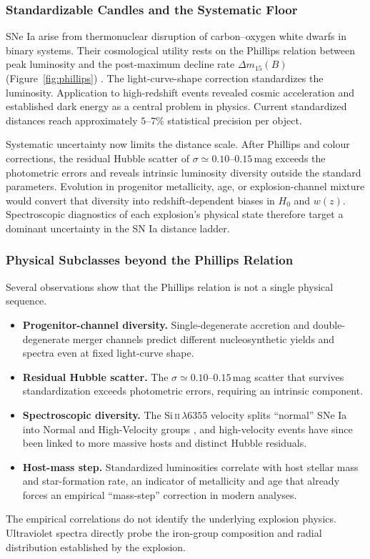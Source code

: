\subsubsection{Standardizable Candles and the Systematic Floor}

SNe Ia arise from thermonuclear disruption of carbon--oxygen white dwarfs in binary systems. Their cosmological utility rests on the Phillips relation between peak luminosity and the post-maximum decline rate $\Delta m_{15}(B)$ (Figure~\ref{fig:phillips}) \cite{phillips1993}. The light-curve-shape correction standardizes the luminosity. Application to high-redshift events revealed cosmic acceleration \cite{riess1998,perlmutter1999} and established dark energy as a central problem in physics. Current standardized distances reach approximately $5$--$7\%$ statistical precision per object.

Systematic uncertainty now limits the distance scale. After Phillips and colour corrections, the residual Hubble scatter of $\sigma\simeq0.10$--$0.15$\,mag exceeds the photometric errors and reveals intrinsic luminosity diversity outside the standard parameters. Evolution in progenitor metallicity, age, or explosion-channel mixture would convert that diversity into redshift-dependent biases in $H_0$ and $w(z)$. Spectroscopic diagnostics of each explosion's physical state therefore target a dominant uncertainty in the SN Ia distance ladder.

\subsubsection{Physical Subclasses beyond the Phillips Relation}

Several observations show that the Phillips relation is not a single physical sequence.
\begin{itemize}
\item \textbf{Progenitor-channel diversity.} Single-degenerate accretion and double-degenerate merger channels predict different nucleosynthetic yields and spectra even at fixed light-curve shape.
\item \textbf{Residual Hubble scatter.} The $\sigma\simeq0.10$--$0.15$\,mag scatter that survives standardization exceeds photometric errors, requiring an intrinsic component.
\item \textbf{Spectroscopic diversity.} The Si\,\textsc{ii}\,$\lambda6355$ velocity splits ``normal'' SNe Ia into Normal and High-Velocity groups \cite{wang2009}, and high-velocity events have since been linked to more massive hosts and distinct Hubble residuals.
\item \textbf{Host-mass step.} Standardized luminosities correlate with host stellar mass and star-formation rate, an indicator of metallicity and age that already forces an empirical ``mass-step'' correction in modern analyses.
\end{itemize}
The empirical correlations do not identify the underlying explosion physics. Ultraviolet spectra directly probe the iron-group composition and radial distribution established by the explosion.

